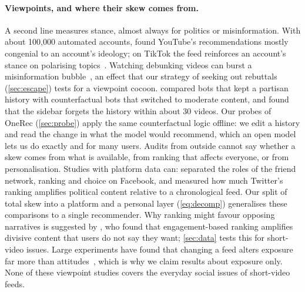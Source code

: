 \paragraph{Viewpoints, and where their skew comes from.} A second line measures stance, almost always for politics or misinformation. With about 100{,}000 automated accounts, \citet{haroon2023youtube} found YouTube's recommendations mostly congenial to an account's ideology; on TikTok the feed reinforces an account's stance on polarising topics~\citep{pecher2026tiktok}. Watching debunking videos can burst a misinformation bubble~\citep{tomlein2021audit,srba2023auditing}, an effect that our strategy of seeking out rebuttals (\cref{sec:escape}) tests for a viewpoint cocoon. \citet{hosseinmardi2024bots} compared bots that kept a partisan history with counterfactual bots that switched to moderate content, and found that the sidebar forgets the history within about 30 videos. Our probes of OneRec (\cref{sec:probe}) apply the same counterfactual logic offline: we edit a history and read the change in what the model would recommend, which an open model lets us do exactly and for many users. Audits from outside cannot say whether a skew comes from what is available, from ranking that affects everyone, or from personalisation. Studies with platform data can: \citet{bakshy2015exposure} separated the roles of the friend network, ranking and choice on Facebook, and \citet{huszar2022amplification} measured how much Twitter's ranking amplifies political content relative to a chronological feed. Our split of total skew into a platform and a personal layer (\cref{eq:decomp}) generalises these comparisons to a single recommender. Why ranking might favour opposing narratives is suggested by \citet{milli2025engagement}, who found that engagement-based ranking amplifies divisive content that users do not say they want; \cref{sec:data} tests this for short-video issues. Large experiments have found that changing a feed alters exposure far more than attitudes~\citep{guess2023feed,nyhan2023likeminded}, which is why we claim results about exposure only. None of these viewpoint studies covers the everyday social issues of short-video feeds.

